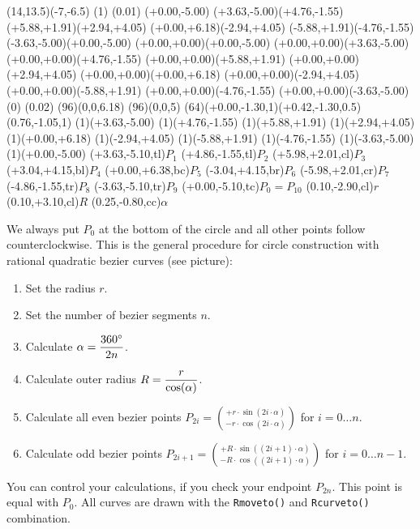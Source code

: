 \begin{center}

\begin{lapdf}(14,13.5)(-7,-6.5)
 \Dash(1)
 \Setwidth(0.01)
 \Polygon(+0.00,-5.00)
 (+3.63,-5.00)(+4.76,-1.55)
 (+5.88,+1.91)(+2.94,+4.05)
 (+0.00,+6.18)(-2.94,+4.05)
 (-5.88,+1.91)(-4.76,-1.55)
 (-3.63,-5.00)(+0.00,-5.00) \Stroke
 \Line(+0.00,+0.00)(+0.00,-5.00) \Stroke
 \Line(+0.00,+0.00)(+3.63,-5.00) \Stroke
 \Line(+0.00,+0.00)(+4.76,-1.55) \Stroke
 \Line(+0.00,+0.00)(+5.88,+1.91) \Stroke
 \Line(+0.00,+0.00)(+2.94,+4.05) \Stroke
 \Line(+0.00,+0.00)(+0.00,+6.18) \Stroke
 \Line(+0.00,+0.00)(-2.94,+4.05) \Stroke
 \Line(+0.00,+0.00)(-5.88,+1.91) \Stroke
 \Line(+0.00,+0.00)(-4.76,-1.55) \Stroke
 \Line(+0.00,+0.00)(-3.63,-5.00) \Stroke
 \Dash(0)
 \Setwidth(0.02)
 \Blue
 \Circle(96)(0,0,6.18) \Stroke
 \Red
 \Circle(96)(0,0,5) \Stroke
 \Black
 \Rcurve(64)(+0.00,-1.30,1)(+0.42,-1.30,0.5)(0.76,-1.05,1) \Stroke
 \Point(1)(+3.63,-5.00)
 \Point(1)(+4.76,-1.55)
 \Point(1)(+5.88,+1.91)
 \Point(1)(+2.94,+4.05)
 \Point(1)(+0.00,+6.18)
 \Point(1)(-2.94,+4.05)
 \Point(1)(-5.88,+1.91)
 \Point(1)(-4.76,-1.55)
 \Point(1)(-3.63,-5.00)
 \Point(1)(+0.00,-5.00)
 \Text(+3.63,-5.10,tl){$P_1$}
 \Text(+4.86,-1.55,tl){$P_2$}
 \Text(+5.98,+2.01,cl){$P_3$}
 \Text(+3.04,+4.15,bl){$P_4$}
 \Text(+0.00,+6.38,bc){$P_5$}
 \Text(-3.04,+4.15,br){$P_6$}
 \Text(-5.98,+2.01,cr){$P_7$}
 \Text(-4.86,-1.55,tr){$P_8$}
 \Text(-3.63,-5.10,tr){$P_9$}
 \Text(+0.00,-5.10,tc){$P_0=P_{10}$}
 \Text(0.10,-2.90,cl){$r$}
 \Text(0.10,+3.10,cl){$R$}
 \Text(0.25,-0.80,cc){$\alpha$}
\end{lapdf}
\end{center}
We always put $P_0$ at the bottom of the circle and all other points
follow counterclockwise.
This is the general procedure for circle construction with rational
quadratic bezier curves (see picture):
\begin{enumerate}
\item Set the radius $r$.
\item Set the number of bezier segments $n$.
\item Calculate $\alpha = \displaystyle {360^\circ \over 2n}$.
\item Calculate outer radius $R=\displaystyle {r \over \cos(\alpha)}$.
\item Calculate all even bezier points
 $P_{2i} = \displaystyle {+r \cdot \sin(2i\cdot\alpha)
           \choose -r \cdot \cos(2i\cdot\alpha)}$ for $i=0 \dots n$.
\item Calculate odd bezier points
 $P_{2i+1} = \displaystyle {+R \cdot \sin((2i+1)\cdot\alpha)
             \choose -R \cdot \cos((2i+1)\cdot\alpha)}$ for $i=0 \dots n-1$.
\end{enumerate}
You can control your calculations, if you check your endpoint $P_{2n}$.
This point is equal with $P_0$. All curves are drawn with the
{\tt Rmoveto()} and {\tt Rcurveto()} combination.

